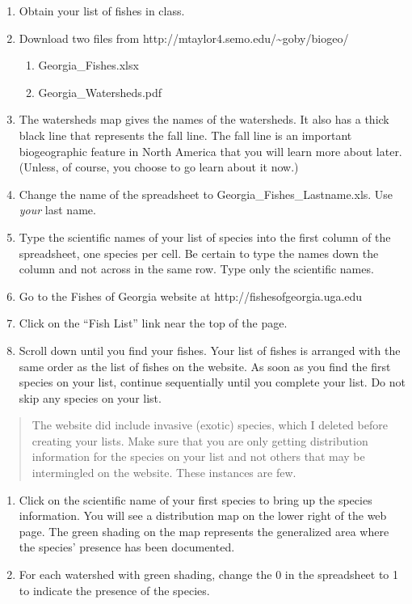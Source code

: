\begin{enumerate}
\def\labelenumi{\arabic{enumi})}
\item
  Obtain your list of fishes in class.
\item
  Download two files from
  http://mtaylor4.semo.edu/\textasciitilde{}goby/biogeo/

  \begin{enumerate}
  \def\labelenumii{\alph{enumii}.}
  \item
    Georgia\_Fishes.xlsx
  \item
    Georgia\_Watersheds.pdf
  \end{enumerate}
\item
  The watersheds map gives the names of the watersheds. It also has a
  thick black line that represents the fall line. The fall line is an
  important biogeographic feature in North America that you will learn
  more about later. (Unless, of course, you choose to go learn about it
  now.)
\item
  Change the name of the spreadsheet to Georgia\_Fishes\_Lastname.xls.
  Use \emph{your} last name.
\item
  Type the scientific names of your list of species into the first
  column of the spreadsheet, one species per cell. Be certain to type
  the names down the column and not across in the same row. Type only
  the scientific names.
\item
  Go to the Fishes of Georgia website at http://fishesofgeorgia.uga.edu
\item
  Click on the ``Fish List'' link near the top of the page.
\item
  Scroll down until you find your fishes. Your list of fishes is
  arranged with the same order as the list of fishes on the website. As
  soon as you find the first species on your list, continue sequentially
  until you complete your list. Do not skip any species on your list.
\end{enumerate}

\begin{quote}
The website did include invasive (exotic) species, which I deleted
before creating your lists. Make sure that you are only getting
distribution information for the species on your list and not others
that may be intermingled on the website. These instances are few.
\end{quote}

\begin{enumerate}
\def\labelenumi{\arabic{enumi})}
\item
  Click on the scientific name of your first species to bring up the
  species information. You will see a distribution map on the lower
  right of the web page. The green shading on the map represents the
  generalized area where the species' presence has been documented.
\item
  For each watershed with green shading, change the 0 in the spreadsheet
  to 1 to indicate the presence of the species.
\end{enumerate}

